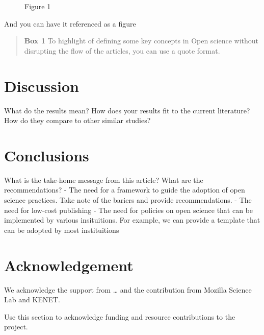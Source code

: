 \begin{figure}[htbp]
\centering
\caption{Figure 1}
\end{figure}

And you can have it referenced as a figure

\begin{quote}
\textbf{Box 1} To highlight of defining some key concepts in Open
science without disrupting the flow of the articles, you can use a quote
format.
\end{quote}

\section*{Discussion}\label{discussion}

What do the results mean? How does your results fit to the current
literature? How do they compare to other similar studies?

\section*{Conclusions}\label{conclusions}

What is the take-home message from this article? What are the
recommendations? - The need for a framework to guide the adoption of
open science practices. Take note of the bariers and provide
recommendations. - The need for low-cost publishing - The need for
policies on open science that can be implemented by various
insituitions. For example, we can provide a template that can be adopted
by most instituitions

\section{Acknowledgement}\label{acknowledgement}

We acknowledge the support from \ldots{} and the contribution from
Mozilla Science Lab and KENET.

Use this section to acknowledge funding and resource contributions to
the project.
